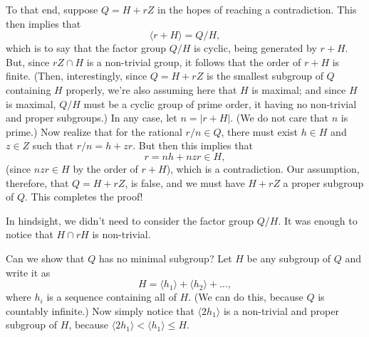 \documentclass[12pt]{article}
\begin{document}
To that end, suppose $Q=H+rZ$ in the hopes of reaching a contradiction.  This then implies that
\begin{equation*}
\langle r+H\rangle = Q/H,
\end{equation*}
which is to say that the factor group $Q/H$ is cyclic, being generated by $r+H$.
But, since $rZ\cap H$ is a non-trivial group, it follows that the order of $r+H$
is finite.  (Then, interestingly, since $Q=H+rZ$ is the smallest subgroup of $Q$
containing $H$ properly, we're also assuming here that $H$ is maximal; and since $H$
is maximal, $Q/H$ must be a cyclic group of prime order, it having no non-trivial
and proper subgroups.)  In any case, let $n=|r+H|$.  (We do not care that $n$ is prime.)
Now realize that for the rational $r/n\in Q$, there must exist $h\in H$ and $z\in Z$
such that $r/n=h+zr$.  But then this implies that
\begin{equation*}
r = nh + nzr\in H,
\end{equation*}
(since $nzr\in H$ by the order of $r+H$), which is a contradiction.
Our assumption, therefore, that $Q=H+rZ$, is false, and we must have
$H+rZ$ a proper subgroup of $Q$.  This completes the proof!

In hindsight, we didn't need to consider the factor group $Q/H$.
It was enough to notice that $H\cap rH$ is non-trivial.

Can we show that $Q$ has no minimal subgroup?
Let $H$ be any subgroup of $Q$ and write it as
\begin{equation*}
H=\langle h_1\rangle + \langle h_2\rangle + \dots,
\end{equation*}
where $h_i$ is a sequence containing all of $H$.  (We can do this,
because $Q$ is countably infinite.)  Now simply notice that
$\langle 2h_1\rangle$ is a non-trivial and proper subgroup of $H$,
because $\langle 2h_1\rangle<\langle h_1\rangle\leq H$.
\end{document}
